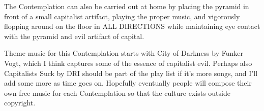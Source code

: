 The Contemplation can also be carried out at home by placing the pyramid
in front of a small capitalist artifact, playing the proper music, and
vigorously flopping around on the floor in ALL DIRECTIONS while
maintaining eye contact with the pyramid and evil artifact of capital.

Theme music for this Contemplation starts with City of Darkness by
Funker Vogt, which I think captures some of the essence of capitalist
evil. Perhaps also Capitalists Suck by DRI should be part of the play
list if it's more songs, and I'll add some more as time goes on.
Hopefully eventually people will compose their own free music for each
Contemplation so that the culture exists outside copyright.
